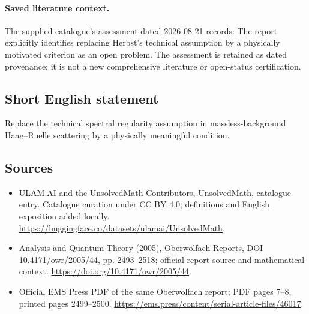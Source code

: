 \documentclass[11pt]{article}
\begin{document}
\paragraph{Saved literature context.} The supplied catalogue's assessment dated 2026-08-21 records: The report explicitly identifies replacing Herbst's technical assumption by a physically motivated criterion as an open problem. The assessment is retained as dated provenance; it is not a new comprehensive literature or open-status certification.
\subsection{Short English statement}
Replace the technical spectral regularity assumption in massless-background Haag--Ruelle scattering by a physically meaningful condition.
\subsection{Sources}
\begin{itemize}
\item[\hypertarget{source:statement:1}{S1}] ULAM.AI and the UnsolvedMath Contributors, UnsolvedMath, catalogue entry. Catalogue curation under CC BY 4.0; definitions and English exposition added locally.
\url{https://huggingface.co/datasets/ulamai/UnsolvedMath}.
\item[\hypertarget{source:statement:2}{S2}] Analysis and Quantum Theory (2005), Oberwolfach Reports, DOI 10.4171/owr/2005/44, pp. 2493--2518; official report source and mathematical context.
\url{https://doi.org/10.4171/owr/2005/44}.
\item[\hypertarget{source:statement:3}{S3}] Official EMS Press PDF of the same Oberwolfach report; PDF pages 7--8, printed pages 2499--2500.
\url{https://ems.press/content/serial-article-files/46017}.
\end{itemize}
\label{end:statement}
\end{document}
